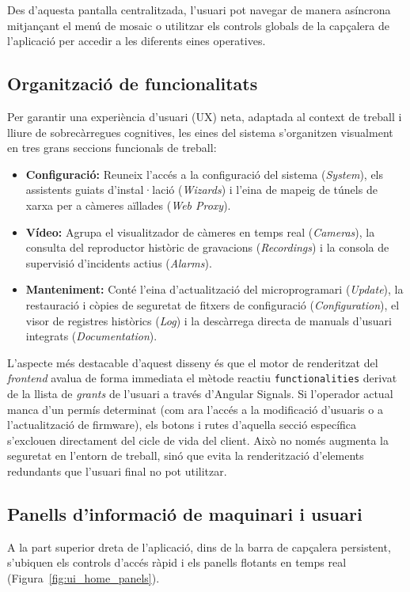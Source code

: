 Des d'aquesta pantalla centralitzada, l'usuari pot navegar de manera asíncrona mitjançant el menú de mosaic o utilitzar els controls globals de la capçalera de l'aplicació per accedir a les diferents eines operatives.

\subsection{Organització de funcionalitats}
Per garantir una experiència d'usuari (UX) neta, adaptada al context de treball i lliure de sobrecàrregues cognitives, les eines del sistema s'organitzen visualment en tres grans seccions funcionals de treball:

\begin{itemize}
  \item \textbf{Configuració:} Reuneix l'accés a la configuració del sistema (\textit{System}), els assistents guiats d'instal·lació (\textit{Wizards}) i l'eina de mapeig de túnels de xarxa per a càmeres aïllades (\textit{Web Proxy}).
  \item \textbf{Vídeo:} Agrupa el visualitzador de càmeres en temps real (\textit{Cameras}), la consulta del reproductor històric de gravacions (\textit{Recordings}) i la consola de supervisió d'incidents actius (\textit{Alarms}).
  \item \textbf{Manteniment:} Conté l'eina d'actualització del microprogramari (\textit{Update}), la restauració i còpies de seguretat de fitxers de configuració (\textit{Configuration}), el visor de registres històrics (\textit{Log}) i la descàrrega directa de manuals d'usuari integrats (\textit{Documentation}).
\end{itemize}

L'aspecte més destacable d'aquest disseny és que el motor de renderitzat del \textit{frontend} avalua de forma immediata el mètode reactiu \texttt{functionalities} derivat de la llista de \textit{grants} de l'usuari a través d'Angular Signals. Si l'operador actual manca d'un permís determinat (com ara l'accés a la modificació d'usuaris o a l'actualització de firmware), els botons i rutes d'aquella secció específica s'exclouen directament del cicle de vida del client. Això no només augmenta la seguretat en l'entorn de treball, sinó que evita la renderització d'elements redundants que l'usuari final no pot utilitzar.

\subsection{Panells d'informació de maquinari i usuari}
A la part superior dreta de l'aplicació, dins de la barra de capçalera persistent, s'ubiquen els controls d'accés ràpid i els panells flotants en temps real (Figura~\ref{fig:ui_home_panels}).

